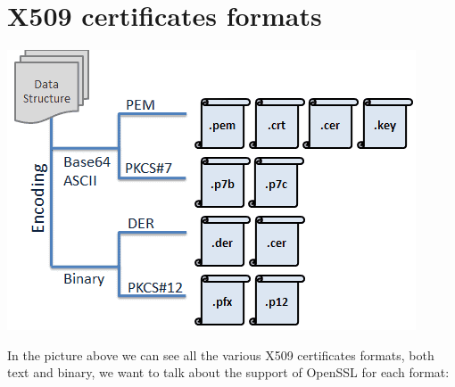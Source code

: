 \documentclass{article}
\begin{document}
\section{X509 certificates formats}
\begin{center}
\includegraphics{HW05-1884749}
\end{center}
In the picture above we can see all the various X509 certificates formats, both text and binary, we want to talk about the support of OpenSSL for each format:\\
\end{document}

